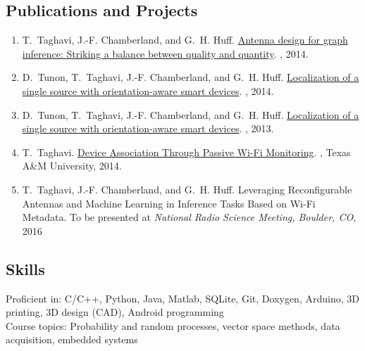 \documentclass[11pt]{article}
\begin{document}
\subsection*{Publications and Projects}

\begin{enumerate}    \itemsep0pt

\item T.~Taghavi, J.-F. Chamberland, and G.~H. Huff.
\newblock \href{http://dx.doi.org/10.1109/USNC-URSI-NRSM.2014.6927995}{Antenna design for graph inference: Striking a balance between quality and quantity}.
, 2014.

\item D.~Tunon, T.~Taghavi, J.-F. Chamberland, and G.~H. Huff.
\newblock \href{http://dx.doi.org/10.1109/USNC-URSI-NRSM.2014.6928007}{Localization of a single source with orientation-aware smart devices}.
, 2014.

\item D.~Tunon, T.~Taghavi, J.-F. Chamberland, and G.~H. Huff.
\newblock \href{http://dx.doi.org/10.1109/GlobalSIP.2013.6736829}{Localization of a single source with orientation-aware smart devices}.
, 2013.

\item T.~Taghavi.
\newblock \href{http://hdl.handle.net/1969.1/152045}{Device Association Through Passive Wi-Fi Monitoring}.
, Texas A\&M University, 2014.

\item T.~Taghavi, J.-F. Chamberland, and G.~H. Huff.
\newblock Leveraging Reconfigurable Antennas and Machine Learning in Inference Tasks Based on Wi-Fi Metadata.
\newblock To be presented at {\em National Radio Science Meeting, Boulder, CO}, 2016

\end{enumerate}

\subsection*{Skills}

Proficient in: C/C++, Python, Java, Matlab, SQLite, Git, Doxygen, Arduino, 3D printing, 3D design (CAD), Android programming \\
Course topics: Probability and random processes, vector space methods, data acquisition, embedded systems\\
\end{document}
